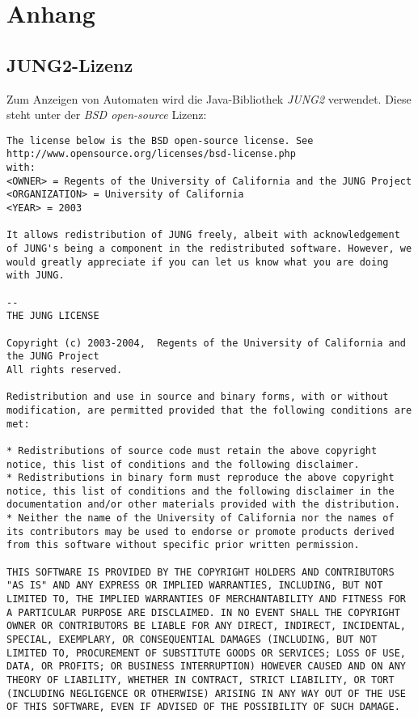 \newpage
\appendix
\section{Anhang}
\subsection*{JUNG2-Lizenz} \label{anhang:zusatz1}
Zum Anzeigen von Automaten wird die Java-Bibliothek \textit{JUNG2} verwendet. Diese steht unter der \textit{BSD open-source} Lizenz:
\begin{lstlisting}[frame=single, caption=Die \textit{BSD open-source} Lizenz]
The license below is the BSD open-source license. See 
http://www.opensource.org/licenses/bsd-license.php
with:
<OWNER> = Regents of the University of California and the JUNG Project
<ORGANIZATION> = University of California
<YEAR> = 2003 

It allows redistribution of JUNG freely, albeit with acknowledgement of JUNG's being a component in the redistributed software. However, we would greatly appreciate if you can let us know what you are doing with JUNG.

--
THE JUNG LICENSE

Copyright (c) 2003-2004,  Regents of the University of California and the JUNG Project 
All rights reserved.

Redistribution and use in source and binary forms, with or without modification, are permitted provided that the following conditions are met:

* Redistributions of source code must retain the above copyright notice, this list of conditions and the following disclaimer.
* Redistributions in binary form must reproduce the above copyright notice, this list of conditions and the following disclaimer in the documentation and/or other materials provided with the distribution.
* Neither the name of the University of California nor the names of its contributors may be used to endorse or promote products derived from this software without specific prior written permission.

THIS SOFTWARE IS PROVIDED BY THE COPYRIGHT HOLDERS AND CONTRIBUTORS "AS IS" AND ANY EXPRESS OR IMPLIED WARRANTIES, INCLUDING, BUT NOT LIMITED TO, THE IMPLIED WARRANTIES OF MERCHANTABILITY AND FITNESS FOR A PARTICULAR PURPOSE ARE DISCLAIMED. IN NO EVENT SHALL THE COPYRIGHT OWNER OR CONTRIBUTORS BE LIABLE FOR ANY DIRECT, INDIRECT, INCIDENTAL, SPECIAL, EXEMPLARY, OR CONSEQUENTIAL DAMAGES (INCLUDING, BUT NOT LIMITED TO, PROCUREMENT OF SUBSTITUTE GOODS OR SERVICES; LOSS OF USE, DATA, OR PROFITS; OR BUSINESS INTERRUPTION) HOWEVER CAUSED AND ON ANY THEORY OF LIABILITY, WHETHER IN CONTRACT, STRICT LIABILITY, OR TORT (INCLUDING NEGLIGENCE OR OTHERWISE) ARISING IN ANY WAY OUT OF THE USE OF THIS SOFTWARE, EVEN IF ADVISED OF THE POSSIBILITY OF SUCH DAMAGE.
\end{lstlisting}
\clearpage
